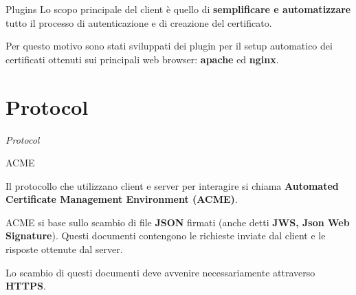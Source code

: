 \documentclass[xcolor=svgnames,11pt]{beamer}
\begin{document}
\begin{frame}{Plugins}
Lo scopo principale del client è quello di \textbf{semplificare e automatizzare} tutto il processo di
autenticazione e di creazione del certificato.

\medskip\pause

Per questo motivo sono stati sviluppati dei plugin per il setup automatico dei certificati ottenuti
sui principali web browser: \textbf{apache} ed \textbf{nginx}.


\end{frame}

\section{Protocol}
\begin{frame}{}
\begin{center}
\begin{Huge}
\textcolor{leorange}{\emph{Protocol}}
\end{Huge}
\end{center}
\end{frame}


\begin{frame}{ACME}

\begin{block}{}
Il protocollo che utilizzano client e server per interagire si chiama \textbf{Automated Certificate Management Environment (ACME)}.
\end{block}

\medskip \pause
ACME si base sullo scambio di file \textbf{JSON} firmati (anche detti \textbf{JWS, Json Web Signature}).
Questi documenti contengono le richieste inviate dal client e le risposte ottenute dal server.

\medskip \pause
Lo scambio di questi documenti deve avvenire necessariamente attraverso \textbf{HTTPS}.
\end{frame}
\end{document}
